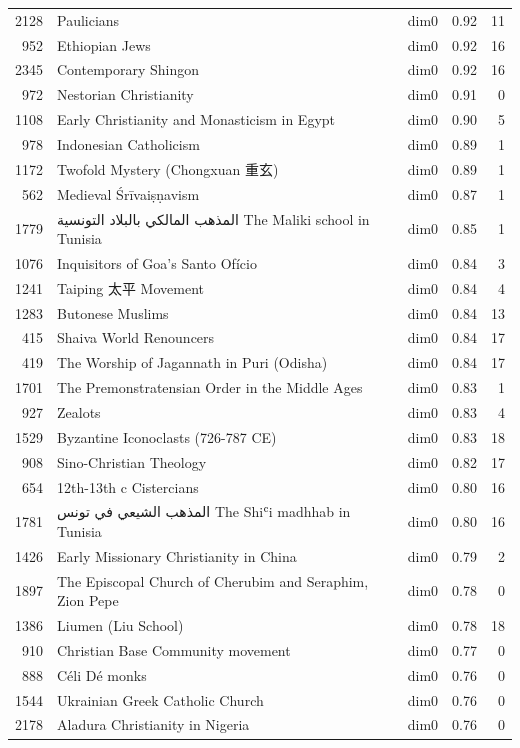 \begin{tabular}{rllrr}
2128 & Paulicians & dim0 & 0.92 & 11 \\
952 & Ethiopian Jews & dim0 & 0.92 & 16 \\
2345 & Contemporary Shingon & dim0 & 0.92 & 16 \\
972 & Nestorian Christianity & dim0 & 0.91 & 0 \\
1108 & Early Christianity and Monasticism in Egypt & dim0 & 0.90 & 5 \\
978 & Indonesian Catholicism & dim0 & 0.89 & 1 \\
1172 & Twofold Mystery (Chongxuan 重玄) & dim0 & 0.89 & 1 \\
562 & Medieval Śrīvaiṣṇavism & dim0 & 0.87 & 1 \\
1779 & المذهب المالكي بالبلاد التونسية The Maliki school in Tunisia & dim0 & 0.85 & 1 \\
1076 & Inquisitors of Goa's Santo Ofício & dim0 & 0.84 & 3 \\
1241 & Taiping 太平 Movement & dim0 & 0.84 & 4 \\
1283 & Butonese Muslims & dim0 & 0.84 & 13 \\
415 & Shaiva World Renouncers & dim0 & 0.84 & 17 \\
419 & The Worship of Jagannath in Puri (Odisha) & dim0 & 0.84 & 17 \\
1701 & The Premonstratensian Order in the Middle Ages & dim0 & 0.83 & 1 \\
927 & Zealots & dim0 & 0.83 & 4 \\
1529 & Byzantine Iconoclasts (726-787 CE) & dim0 & 0.83 & 18 \\
908 & Sino-Christian Theology & dim0 & 0.82 & 17 \\
654 & 12th-13th c Cistercians & dim0 & 0.80 & 16 \\
1781 & المذهب الشيعي في تونس The Shiʿi madhhab in Tunisia & dim0 & 0.80 & 16 \\
1426 & Early Missionary Christianity in China & dim0 & 0.79 & 2 \\
1897 & The Episcopal Church of Cherubim and Seraphim, Zion Pepe & dim0 & 0.78 & 0 \\
1386 & Liumen (Liu School) & dim0 & 0.78 & 18 \\
910 & Christian Base Community movement & dim0 & 0.77 & 0 \\
888 & Céli Dé monks & dim0 & 0.76 & 0 \\
1544 & Ukrainian Greek Catholic Church & dim0 & 0.76 & 0 \\
2178 & Aladura Christianity in Nigeria & dim0 & 0.76 & 0 \\

\end{tabular}

